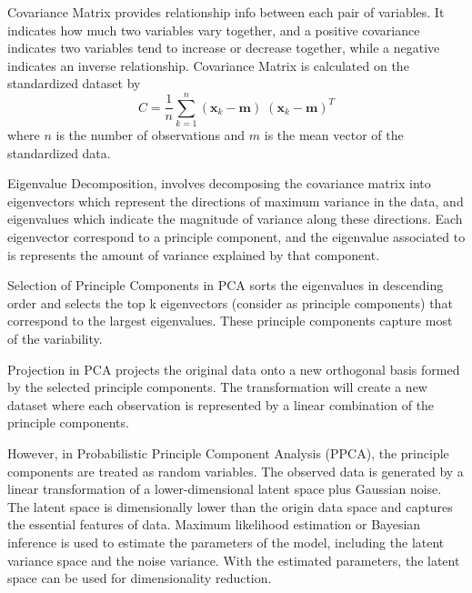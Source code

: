 \documentclass[12pt,a4paper,english
]{tunithesis}
\begin{document}
Covariance Matrix provides relationship info between each pair of variables. It indicates how much two variables vary together, and a positive covariance indicates two variables tend to increase or decrease together, while a negative indicates an inverse relationship. Covariance Matrix is calculated on the standardized dataset by 
\begin{equation}
    C = \frac{1}{n}\sum\limits_{k=1}^n (\pmb x_k - \pmb m)\;(\pmb x_k - \pmb m)^T
\end{equation}
where $n$ is the number of observations and $m$ is the mean vector of the standardized data.

Eigenvalue Decomposition, involves decomposing the covariance matrix into eigenvectors which represent the directions of maximum variance in the data, and eigenvalues which indicate the magnitude of variance along these directions. Each eigenvector correspond to a principle component, and the eigenvalue associated to is represents the amount of variance explained by that component. 

Selection of Principle Components in PCA sorts the eigenvalues in descending order and selects the top k eigenvectors (consider as principle components) that correspond to the largest eigenvalues. These principle components capture most of the variability.

Projection in PCA projects the original data onto a new orthogonal basis formed by the selected principle components. The transformation will create a new dataset where each observation is represented by a linear combination of the principle components.

However, in Probabilistic Principle Component Analysis (PPCA), the principle components are treated as random variables. The observed data is generated by a linear transformation of a lower-dimensional latent space plus Gaussian noise. The latent space is dimensionally lower than the origin data space and captures the essential features of data. Maximum likelihood estimation or Bayesian inference is used to estimate the parameters of the model, including the latent variance space and the noise variance. With the estimated parameters, the latent space can be used for dimensionality reduction. 
\end{document}
